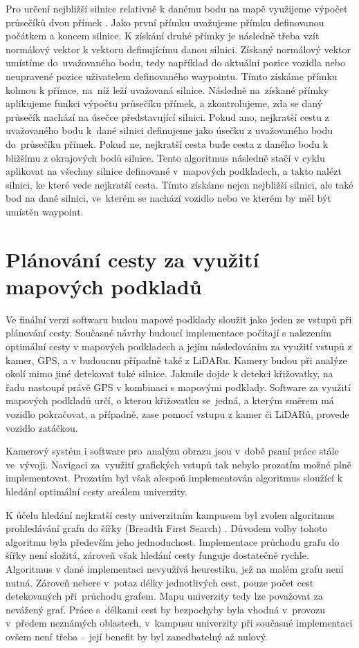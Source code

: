 \documentclass[czech, bachelor]{diploma}
\begin{document}
Pro určení nejbližší silnice relativně k danému bodu na mapě využijeme výpočet průsečíků dvou přímek \cite{
line-line-intersection-source}. Jako první přímku uvažujeme přímku definovanou počátkem a koncem silnice. K získání druhé přímky
je následně třeba vzít normálový vektor k vektoru definujícímu danou silnici. Získaný normálový vektor umístíme do~uvažovaného
bodu, tedy například do aktuální pozice vozidla nebo neupravené pozice uživatelem definovaného waypointu. Tímto získáme přímku
kolmou k přímce, na~níž leží uvažovaná silnice. Následně na~získané přímky aplikujeme funkci výpočtu průsečíku přímek,
a zkontrolujeme, zda se daný průsečík nachází na úsečce představující silnici. Pokud ano, nejkratší cestu z uvažovaného bodu
k~dané silnici definujeme jako úsečku z uvažovaného bodu do~průsečíku přímek. Pokud ne, nejkratší cesta bude cesta z daného bodu
k bližšímu z okrajových bodů silnice. Tento algoritmus následně stačí v cyklu aplikovat na všechny silnice definované v~mapových
podkladech, a takto nalézt silnici, ke které vede nejkratší cesta. Tímto získáme nejen nejbližší silnici, ale také bod na dané
silnici, ve~kterém se nachází vozidlo nebo ve kterém by měl být umístěn waypoint.

\section{Plánování cesty za využití mapových podkladů}

Ve finální verzi softwaru budou mapové podklady sloužit jako jeden ze vstupů při plánování cesty. Současné návrhy budoucí
implementace počítají s nalezením optimální cesty v mapových podkladech a jejím následováním za využití vstupů z kamer, GPS,
a v budoucnu případně také z LiDARu. Kamery budou při analýze okolí mimo jiné detekovat také silnice. Jakmile dojde k detekci
křižovatky, na řadu nastoupí právě GPS v kombinaci s mapovými podklady. Software za využití mapových podkladů určí, o kterou
křižovatku se~jedná, a kterým směrem má vozidlo pokračovat, a případně, zase pomocí vstupu z kamer či LiDARů, provede vozidlo
zatáčkou.

Kamerový systém i software pro~analýzu obrazu jsou v~době psaní práce stále ve~vývoji. Navigaci za~využití grafických vstupů
tak nebylo prozatím možné plně implementovat. Prozatím byl však alespoň implementován algoritmus sloužící k hledání optimální
cesty areálem univerzity.

K účelu hledání nejkratší cesty univerzitním kampusem byl zvolen algoritmus prohledávání grafu do šířky (Breadth First
Search) \cite{bfs-source}.  Důvodem volby tohoto algoritmu byla především jeho jednoduchost. Implementace průchodu grafu do šířky
není složitá, zároveň však hledání cesty funguje dostatečně rychle. Algoritmus v dané implementaci nevyužívá heurestiku, jež
na malém grafu není nutná. Zároveň nebere v~potaz délky jednotlivých cest, pouze počet cest detekovaných při~průchodu grafem. Mapu
univerzity tedy lze považovat za nevážený graf. Práce s~délkami cest by bezpochyby byla vhodná v~provozu v~předem neznámých
oblastech, v~kampusu univerzity při současné implementaci ovšem není třeba -- její benefit by byl zanedbatelný až nulový.
\end{document}

